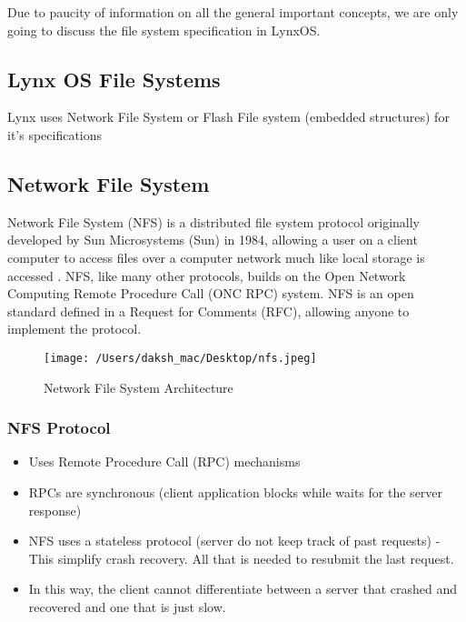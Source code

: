 \documentclass[12pt]{article}
\begin{document}
Due to paucity of information on all the general important concepts, we are only going to discuss the file system specification in LynxOS.


\subsection{Lynx OS File Systems}

Lynx uses Network File System or Flash File system (embedded structures) for it's specifications	


\subsection{Network File System}

Network File System (NFS) is a distributed file system protocol originally developed by Sun Microsystems (Sun) in 1984, allowing a user on a client computer to access files over a computer network much like local storage is accessed \cite{ref:ten}. NFS, like many other protocols, builds on the Open Network Computing Remote Procedure Call (ONC RPC) system. NFS is an open standard defined in a Request for Comments (RFC), allowing anyone to implement the protocol.


\begin{figure}[H]
	\centering
	\texttt{[image: /Users/daksh\_mac/Desktop/nfs.jpeg]}
	\caption[About file system]{Network File System Architecture}
	\label{fig:nfs}	
\end{figure}

\subsubsection{NFS Protocol}

\begin{itemize}
	\item Uses Remote Procedure Call (RPC) mechanisms	
	\item RPCs are synchronous (client application blocks while waits for the server response)		
	\item NFS uses a stateless protocol (server do not keep track of past requests) - This simplify crash recovery. All that is needed to resubmit the last request.
	
	\item In this way, the client cannot differentiate between a server that crashed and recovered and one that is just slow.
	

\end{itemize}
\end{document}
